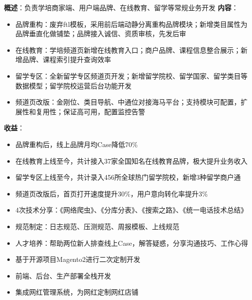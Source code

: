 \documentclass{resume}
\begin{document}
    \begin{onehalfspacing}
        \textbf{概述}：负责学培商家端、用户端品牌、在线教育、留学等常规业务开发\newline
        \textbf{内容}：
        \begin{itemize}
            \item 品牌重构：废弃ftl模板，采用前后端动静分离重构品牌模块；新增类目属性为品牌垂直化做铺垫；品牌接入诚信、资质审核，先发后审
            \item 在线教育：学培频道页新增在线教育入口；商户品牌、课程信息整合展示；新增品牌、课程索引提升查询效率
            \item 留学专区：全新留学专区频道页开发；新增留学院校、留学国家、留学类目等数据模型；留学院校运营后台功能开发
            \item 频道页改版：金刚位、类目导航、中通位对接海马平台；支持模块可配置，扩展性和复用性；保证高可用，配置监控告警
        \end{itemize}
        \textbf{收益}：
        \begin{itemize}
            \item 品牌重构后，线上品牌月均Case降低70\%
            \item 在线教育上线至今，共计接入37家全国知名在线教育品牌，极大提升业务收入
            \item 留学专区上线至今，共计录入456所全球热门留学院校，新增3种留学商户通
            \item 频道页改版后，首页打开速度提升30\%，用户意向转化率提升3\%
        \end{itemize}
    \end{onehalfspacing}
    \blankline{ }

    \begin{onehalfspacing}
        \begin{itemize}
            \item 4次技术分享：《网络爬虫》、《分库分表》、《搜索之路》、《统一电话技术总结》
            \item 规范制定：日志规范、压测规范、周报模板、上线规范
            \item 人才培养：帮助两位新人排查线上Case，解答疑惑，分享沟通技巧、工作心得
        \end{itemize}
    \end{onehalfspacing}
    \blankline{ }

    \begin{onehalfspacing}
        \begin{itemize}
            \item 基于开源项目Magento2进行二次定制开发
            \item 前端、后台、生产部署全栈开发
            \item 集成网红管理系统，为网红定制网红店铺
        \end{itemize}
    \end{onehalfspacing}
    \blankline{ }
\end{document}
